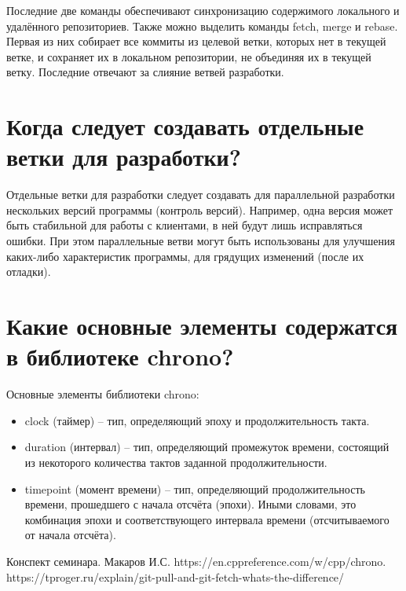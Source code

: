 \documentclass[a4paper,12pt]{article}	%
\begin{document}
	Последние две команды обеспечивают синхронизацию содержимого локального и удалённого репозиториев. Также можно выделить команды fetch, merge и rebase. Первая из них собирает все коммиты из целевой ветки, которых нет в текущей ветке, и сохраняет их в локальном репозитории, не объединяя их в текущей ветку. Последние отвечают за слияние ветвей разработки.

\newpage

\section{Когда следует создавать отдельные ветки для разработки?}

	Отдельные ветки для разработки следует создавать для параллельной разработки нескольких версий программы (контроль версий). Например, одна версия может быть стабильной для работы с клиентами, в ней будут лишь исправляться ошибки. При этом параллельные ветви могут быть использованы для улучшения каких-либо характеристик программы, для грядущих изменений (после их отладки).
	
\newpage

\section{Какие основные элементы содержатся в библиотеке chrono?}
	
	Основные элементы библиотеки chrono:
	
	\begin{itemize}
	
		\item clock (таймер) -- тип, определяющий эпоху и продолжительность такта.
		
		\item duration (интервал) -- тип, определяющий промежуток времени, состоящий из некоторого количества тактов заданной продолжительности.
		
		\item timepoint (момент времени) -- тип, определяющий продолжительность времени, прошедшего с начала отсчёта (эпохи). Иными словами, это комбинация эпохи и соответствующего интервала времени (отсчитываемого от начала отсчёта).
	
	\end{itemize}
	
\newpage


 
	\begin{thebibliography}{}
	
		 Конспект семинара. Макаров И.С.
		 https://en.cppreference.com/w/cpp/chrono.
		 https://tproger.ru/explain/git-pull-and-git-fetch-whats-the-difference/		
		
	\end{thebibliography}
\end{document}

